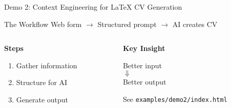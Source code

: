 \documentclass[aspectratio=169]{beamer}
\begin{document}
\begin{frame}{Demo 2: Context Engineering for LaTeX CV Generation}
  \begin{block}{The Workflow}
    Web form $\rightarrow$ Structured prompt $\rightarrow$ AI creates CV
  \end{block}

  \vspace{0.5cm}

  \begin{columns}[T]
    \begin{column}{0.48\textwidth}
      \centering
      \large\bfseries
      \textcolor{conesaTeal}{Steps}

      \vspace{0.3cm}
      \normalsize

      \begin{enumerate}
        \item Gather information
        \item Structure for AI
        \item Generate output
      \end{enumerate}
    \end{column}
    \begin{column}{0.48\textwidth}
      \centering
      \large\bfseries
      \textcolor{conesaOrange}{Key Insight}

      \vspace{0.3cm}
      \normalsize

      Better input\\
      $\Downarrow$\\
      Better output

      \vspace{0.3cm}
      \small
      See \texttt{examples/demo2/index.html}
    \end{column}
  \end{columns}
\end{frame}
\end{document}
